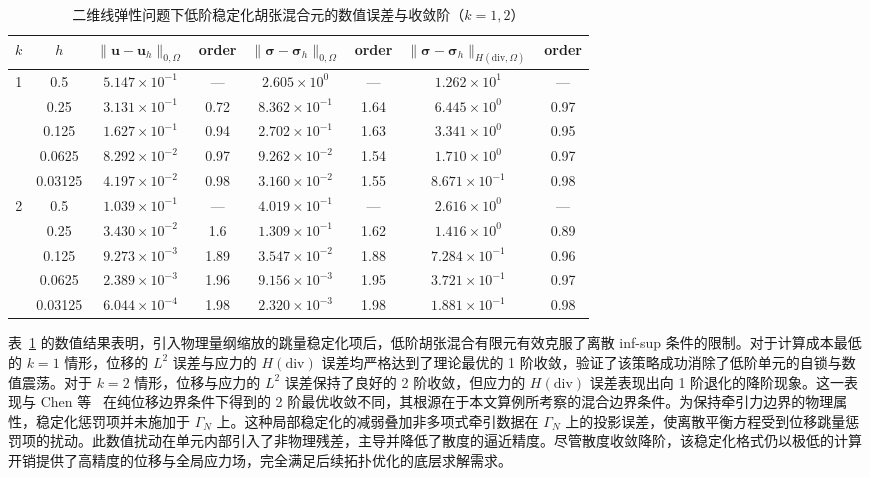 \begin{table}[htbp]
	\centering
	\caption{二维线弹性问题下低阶稳定化胡张混合元的数值误差与收敛阶（$k=1, 2$）}
	\label{tab:ch5_error_analysis_k12}
	\renewcommand{\arraystretch}{1.3} %
	\begin{tabular}{cccccccc}
		\toprule
		$k$ & $h$ & $\|\bm{u} - \bm{u}_h\|_{0,\Omega}$ & order & $\|\bm{\sigma} - \bm{\sigma}_h\|_{0,\Omega}$ & order & $\|\bm{\sigma} - \bm{\sigma}_h\|_{H(\mathrm{div},\Omega)}$ & order \\
		\midrule
		\multirow{5}{*}{1} 
		& 0.5     & $5.147 \times 10^{-1}$ & ---  & $2.605 \times 10^{0} $ & ---  & $1.262 \times 10^{1} $ & ---  \\
		& 0.25    & $3.131 \times 10^{-1}$ & 0.72 & $8.362 \times 10^{-1}$ & 1.64 & $6.445 \times 10^{0} $ & 0.97 \\
		& 0.125   & $1.627 \times 10^{-1}$ & 0.94 & $2.702 \times 10^{-1}$ & 1.63 & $3.341 \times 10^{0} $ & 0.95 \\
		& 0.0625  & $8.292 \times 10^{-2}$ & 0.97 & $9.262 \times 10^{-2}$ & 1.54 & $1.710 \times 10^{0} $ & 0.97 \\
		& 0.03125 & $4.197 \times 10^{-2}$ & 0.98 & $3.160 \times 10^{-2}$ & 1.55 & $8.671 \times 10^{-1}$ & 0.98 \\
		\midrule
		\multirow{5}{*}{2} 
		& 0.5     & $1.039 \times 10^{-1}$ & ---  & $4.019 \times 10^{-1}$ & ---  & $2.616 \times 10^{0}$ & ---  \\
		& 0.25    & $3.430 \times 10^{-2}$ & 1.6  & $1.309 \times 10^{-1}$ & 1.62 & $1.416 \times 10^{0}$ & 0.89 \\
		& 0.125   & $9.273 \times 10^{-3}$ & 1.89 & $3.547 \times 10^{-2}$ & 1.88 & $7.284 \times 10^{-1}$ & 0.96 \\
		& 0.0625  & $2.389 \times 10^{-3}$ & 1.96 & $9.156 \times 10^{-3}$ & 1.95 & $3.721 \times 10^{-1}$ & 0.97 \\
		& 0.03125 & $6.044 \times 10^{-4}$ & 1.98 & $2.320 \times 10^{-3}$ & 1.98 & $1.881 \times 10^{-1}$ & 0.98 \\
		\bottomrule
	\end{tabular}
\end{table}

表~\ref{tab:ch5_error_analysis_k12} 的数值结果表明，引入物理量纲缩放的跳量稳定化项后，低阶胡张混合有限元有效克服了离散 inf-sup 条件的限制。对于计算成本最低的 $k=1$ 情形，位移的 $L^2$ 误差与应力的 $H(\mathrm{div})$ 误差均严格达到了理论最优的 1 阶收敛，验证了该策略成功消除了低阶单元的自锁与数值震荡。对于 $k=2$ 情形，位移与应力的 $L^2$ 误差保持了良好的 2 阶收敛，但应力的 $H(\mathrm{div})$ 误差表现出向 1 阶退化的降阶现象。这一表现与 Chen 等~\cite{chenStabilizedMixedFinite2017a} 在纯位移边界条件下得到的 2 阶最优收敛不同，其根源在于本文算例所考察的混合边界条件。为保持牵引力边界的物理属性，稳定化惩罚项并未施加于 $\Gamma_N$ 上。这种局部稳定化的减弱叠加非多项式牵引数据在 $\Gamma_N$ 上的投影误差，使离散平衡方程受到位移跳量惩罚项的扰动。此数值扰动在单元内部引入了非物理残差，主导并降低了散度的逼近精度。尽管散度收敛降阶，该稳定化格式仍以极低的计算开销提供了高精度的位移与全局应力场，完全满足后续拓扑优化的底层求解需求。


